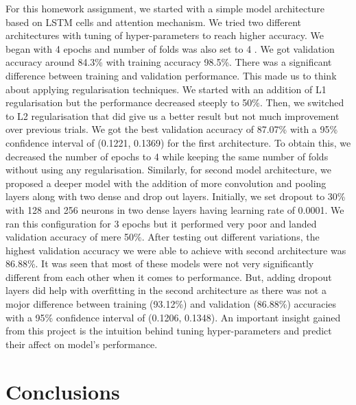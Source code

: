 \documentclass{article}
\begin{document}
For this homework assignment, we started with a simple model architecture based on LSTM cells and attention mechanism. We tried two different architectures with tuning of hyper-parameters to reach higher accuracy. We began with 4 epochs and number of folds was also set to 4 . We got validation accuracy around 84.3\% with training accuracy 98.5\%.  There was a significant difference between training and validation performance. This made us to think about  applying regularisation techniques. We started with an addition of L1 regularisation but the  performance decreased steeply to  50\%. Then, we switched to L2 regularisation that did give us a better result but not much improvement over previous trials. We got the best validation accuracy of 87.07\% with a 95\% confidence interval of (0.1221, 0.1369) for the first architecture. To obtain this, we decreased the number of epochs to 4 while keeping the same number of folds without using any regularisation. Similarly, for second model architecture, we proposed a deeper model with the addition of more convolution and pooling layers along with two dense and drop out layers. Initially, we set dropout to 30\% with 128 and 256 neurons in two dense layers having learning rate of 0.0001. We ran this configuration for 3 epochs but it performed very poor and landed validation accuracy of mere 50\%. After testing out different variations, the highest validation accuracy we were able to achieve with second architecture was 86.88\%.  It was seen that most of these models were not very significantly different from each other when it comes to performance. But, adding dropout layers did help with overfitting in the second architecture as there was not a mojor difference between training (93.12\%) and validation (86.88\%) accuracies with a 95\% confidence interval of (0.1206, 0.1348). An important insight gained from this project is the intuition behind tuning hyper-parameters and predict their affect on model's performance.







\section{Conclusions}
\end{document}
